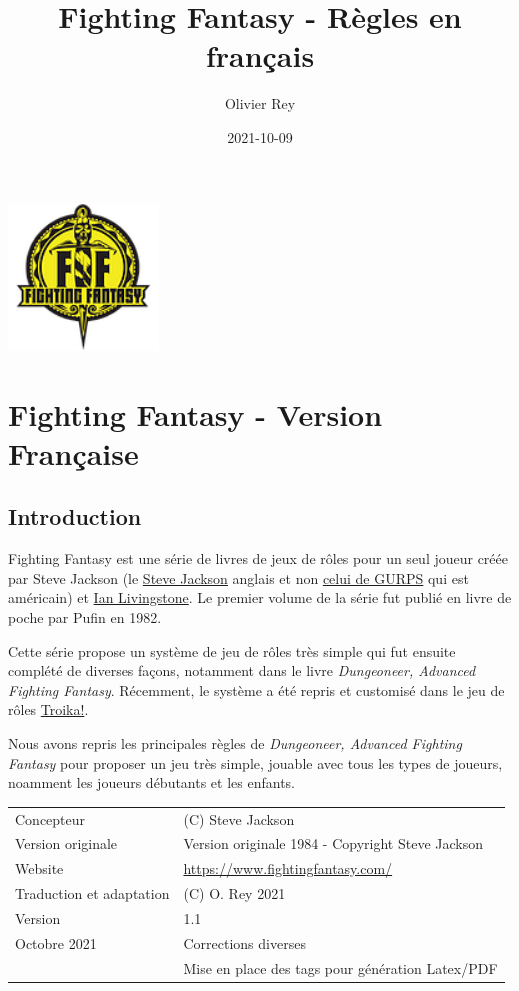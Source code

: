 \documentclass[a4paper, 11pt, twoside]{article}
\author{Olivier Rey}
\date{2021-10-09}
\title{Fighting Fantasy - Règles en français}
\begin{document}
\maketitle
\tableofcontents

\newpage

\begin{center}
\includegraphics[width=4cm]{FF2018.png}
\end{center}

\section{Fighting Fantasy - Version Française}
\label{sec:orgb2036cd}

\subsection{Introduction}
\label{sec:org3b872d4}

Fighting Fantasy est une série de livres de jeux de rôles pour un seul joueur créée par Steve Jackson (le \href{https://en.wikipedia.org/wiki/Steve\_Jackson\_(British\_game\_designer)}{Steve Jackson} anglais et non \href{https://en.wikipedia.org/wiki/Steve\_Jackson\_(American\_game\_designer)}{celui de GURPS} qui est américain) et \href{https://en.wikipedia.org/wiki/Ian\_Livingstone}{Ian Livingstone}. Le premier volume de la série fut publié en livre de poche par Pufin en 1982.

Cette série propose un système de jeu de rôles très simple qui fut ensuite complété de diverses façons, notamment dans le livre \emph{Dungeoneer, Advanced Fighting Fantasy}. Récemment, le système a été repris et customisé dans le jeu de rôles \href{https://melsonian-arts-council.itch.io/troika-numinous-edition}{Troika!}.

Nous avons repris les principales règles de  \emph{Dungeoneer, Advanced Fighting Fantasy} pour proposer un jeu très simple, jouable avec tous les types de joueurs, noamment les joueurs débutants et les enfants.

\begin{longtable}{ll}
Concepteur & (C) Steve Jackson\\
Version originale & Version originale 1984 - Copyright Steve Jackson\\
Website & \href{https://www.fightingfantasy.com/}{https://www.fightingfantasy.com/}\\
Traduction et adaptation & (C) O. Rey 2021\\
Version & 1.1\\
Octobre 2021 & Corrections diverses\\
 & Mise en place des tags pour génération Latex/PDF\\
\end{longtable}
\end{document}
